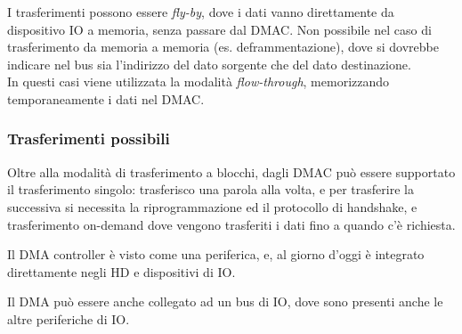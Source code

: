 \documentclass[../template]{subfiles}
\begin{document}
I trasferimenti possono essere \textit{fly-by}, dove i dati vanno direttamente da dispositivo IO a memoria, senza passare dal DMAC. Non possibile nel caso di trasferimento da memoria a memoria (es. deframmentazione), dove si dovrebbe indicare nel bus sia l'indirizzo del dato sorgente che del dato destinazione.
\\
In questi casi viene utilizzata la modalità \textit{flow-through}, memorizzando temporaneamente i dati nel DMAC.


\subsubsection{Trasferimenti possibili}
Oltre alla modalità di trasferimento a blocchi, dagli DMAC può essere supportato il trasferimento singolo: trasferisco una parola alla volta, e per trasferire la successiva si necessita la riprogrammazione ed il protocollo di handshake, e trasferimento on-demand dove vengono trasferiti i dati fino a quando c'è richiesta.

Il DMA controller è visto come una periferica, e, al giorno d'oggi è integrato direttamente negli HD e dispositivi di IO.

Il DMA può essere anche collegato ad un bus di IO, dove sono presenti anche le altre periferiche di IO.
\end{document}
